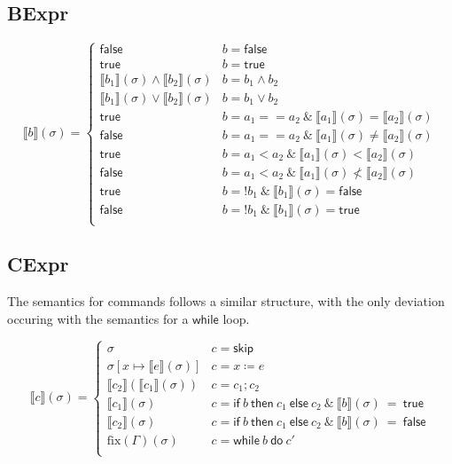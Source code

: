 \documentclass{lecturenotes}
\newcommand{\sem}[1]{\llbracket #1 \rrbracket}
\newcommand{\semapp}[2]{\sem{#1}(#2)}
\newcommand{\semappsig}[1]{\semapp{#1}{\sigma}}
\newcommand{\imp}[1]{\textsf{#1}}
\begin{document}
\subsection{BExpr}
\[
  \semappsig{b} = \begin{cases}
   \imp{false} & b = \imp{false}\\
   \imp{true}  & b = \imp{true}\\
    \semappsig{b_1} \wedge \semappsig{b_2} & b = b_1\wedge b_2\\
    \semappsig{b_1} \vee \semappsig{b_2} & b = b_1\vee b_2\\
   \imp{true} & b = a_1 == a_2~\&~\semappsig{a_1} = \semappsig{a_2}\\
   \imp{false} & b = a_1 == a_2~\&~\semappsig{a_1} \ne \semappsig{a_2}\\
   \imp{true} & b = a_1 < a_2~\&~\semappsig{a_1} < \semappsig{a_2}\\
   \imp{false} & b = a_1 < a_2~\&~\semappsig{a_1} \nless \semappsig{a_2}\\
   \imp{true} & b = !b_1~\&~\semappsig{b_1} = \imp{false}\\
   \imp{false} & b = !b_1~\&~\semappsig{b_1} = \imp{true}\\
  \end{cases}
\]

\subsection{CExpr}
The semantics for commands follows a similar structure, with the only deviation occuring with the semantics for a $\imp{while}$ loop.

\[
  \semappsig{c} = \begin{cases}
    \sigma & c = \imp{skip}\\
    \sigma[x \mapsto \semappsig{e}]  & c = x \coloneq e \\
    \semapp{c_2}{\semappsig{c_1}} & c = c_1; c_2\\
    \sem{c_1}(\sigma) & c = \imp{if}~b~\imp{then}~c_1~\imp{else}~c_2~\&~\sem{b}(\sigma)~=~\imp{true}\\
    \sem{c_2}(\sigma) & c = \imp{if}~b~\imp{then}~c_1~\imp{else}~c_2~\&~\sem{b}(\sigma)~=~\imp{false}\\
    \text{fix}(\Gamma)(\sigma) & c = \imp{while}~b~\imp{do}~c'\\
  \end{cases}
\]
\end{document}
